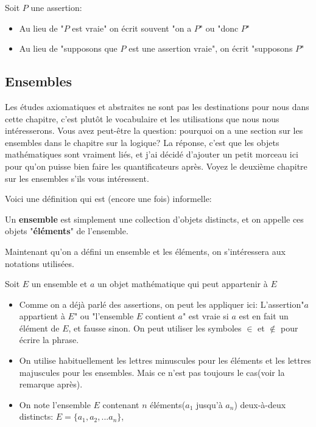 \documentclass{article}
\begin{document}
Soit $P$ une assertion:
\begin{itemize}
  \item Au lieu de "$P$ est vraie" on écrit souvent "on a $P$" ou "donc $P$"
  \item Au lieu de "supposons que $P$ est une assertion vraie", on écrit "supposons $P$" 
\end{itemize}

\subsection{Ensembles}

Les études axiomatiques et abstraites ne sont pas les destinations pour nous dans cette chapitre, c'est plutôt le vocabulaire et les utilisations que nous nous intéresserons. Vous avez peut-être la question: pourquoi on a une section sur les ensembles dans le chapitre sur la logique? La réponse, c'est que les objets mathématiques sont vraiment liés, et j'ai décidé d'ajouter un petit morceau ici pour qu'on puisse bien faire les quantificateurs après. Voyez le deuxième chapitre sur les ensembles s'ils vous intéressent. 

Voici une définition qui est (encore une fois) informelle:

\begin{tcolorbox}[colback=red!5!white,colframe=red!75!black,title=Définition 1.2]
  Un \textbf{ensemble} est simplement une collection d'objets distincts, et on appelle ces objets "\textbf{éléments}" de l'ensemble.
\end{tcolorbox}

Maintenant qu'on a défini un ensemble et les éléments, on s'intéressera aux notations utilisées.

Soit $E$ un ensemble et $a$ un objet mathématique qui peut appartenir à $E$
\begin{itemize}
  \item Comme on a déjà parlé des assertions, on peut les appliquer ici: L'assertion"$a$ appartient à $E$" ou "l'ensemble $E$ contient $a$" est vraie si $a$ est en fait un élément de $E$, et fausse sinon. On peut utiliser les symboles $\in$ et $\notin$ pour écrire la phrase. 
  \item On utilise habituellement les lettres minuscules pour les éléments et les lettres majuscules pour les ensembles. Mais ce n'est pas toujours le cas(voir la remarque après).
  \item On note l'ensemble $E$ contenant $n$ éléments($a_1$ jusqu'à $a_n$) deux-à-deux distincts: $E=\{a_1, a_2, ... a_n\}$, 
\end{itemize}
\end{document}
